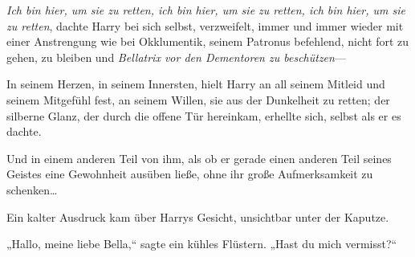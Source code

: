 \emph{Ich bin hier, um sie zu retten, ich bin hier, um sie zu retten, ich bin hier, um sie zu retten}, dachte Harry bei sich selbst, verzweifelt, immer und immer wieder mit einer Anstrengung wie bei Okklumentik, seinem Patronus befehlend, nicht fort zu gehen, zu bleiben und \emph{Bellatrix vor den Dementoren zu beschützen}—

In seinem Herzen, in seinem Innersten, hielt Harry an all seinem Mitleid und seinem Mitgefühl fest, an seinem Willen, sie aus der Dunkelheit zu retten; der silberne Glanz, der durch die offene Tür hereinkam, erhellte sich, selbst als er es dachte.

Und in einem anderen Teil von ihm, als ob er gerade einen anderen Teil seines Geistes eine Gewohnheit ausüben ließe, ohne ihr große Aufmerksamkeit zu schenken…

Ein kalter Ausdruck kam über Harrys Gesicht, unsichtbar unter der Kaputze.

„Hallo, meine liebe Bella,“ sagte ein kühles Flüstern. „Hast du mich vermisst?“

